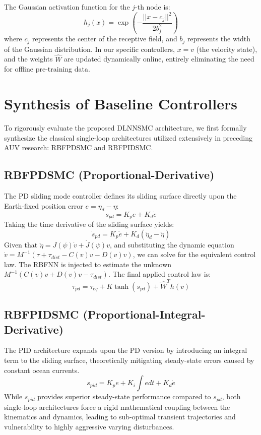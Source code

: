 \documentclass[conference]{IEEEtran}
\begin{document}
The Gaussian activation function for the $j$-th node is:
\begin{equation}
h_j(x) = \exp \left( - \frac{||x - c_j||^2}{2b_j^2} \right)
\end{equation}
where $c_j$ represents the center of the receptive field, and $b_j$ represents the width of the Gaussian distribution. In our specific controllers, $x = v$ (the velocity state), and the weights $\hat{W}$ are updated dynamically online, entirely eliminating the need for offline pre-training data.

\section{Synthesis of Baseline Controllers}
To rigorously evaluate the proposed DLNNSMC architecture, we first formally synthesize the classical single-loop architectures utilized extensively in preceding AUV research: RBFPDSMC and RBFPIDSMC.

\subsection{RBFPDSMC (Proportional-Derivative)}
The PD sliding mode controller defines its sliding surface directly upon the Earth-fixed position error $e = \eta_d - \eta$:
\begin{equation}
s_{pd} = K_p e + K_d \dot{e}
\end{equation}
Taking the time derivative of the sliding surface yields:
\begin{equation}
\dot{s}_{pd} = K_p \dot{e} + K_d (\ddot{\eta}_d - \ddot{\eta})
\end{equation}
Given that $\ddot{\eta} = J(\psi) \dot{v} + \dot{J}(\psi)v$, and substituting the dynamic equation $\dot{v} = M^{-1}(\tau + \tau_{dist} - C(v)v - D(v)v)$, we can solve for the equivalent control law. The RBFNN is injected to estimate the unknown $M^{-1}(C(v)v + D(v)v - \tau_{dist})$. 
The final applied control law is:
\begin{equation}
\tau_{pd} = \tau_{eq} + K \tanh(s_{pd}) + \hat{W}^T h(v)
\end{equation}

\subsection{RBFPIDSMC (Proportional-Integral-Derivative)}
The PID architecture expands upon the PD version by introducing an integral term to the sliding surface, theoretically mitigating steady-state errors caused by constant ocean currents.
\begin{equation}
s_{pid} = K_p e + K_i \int e dt + K_d \dot{e}
\end{equation}
While $s_{pid}$ provides superior steady-state performance compared to $s_{pd}$, both single-loop architectures force a rigid mathematical coupling between the kinematics and dynamics, leading to sub-optimal transient trajectories and vulnerability to highly aggressive varying disturbances.
\end{document}
